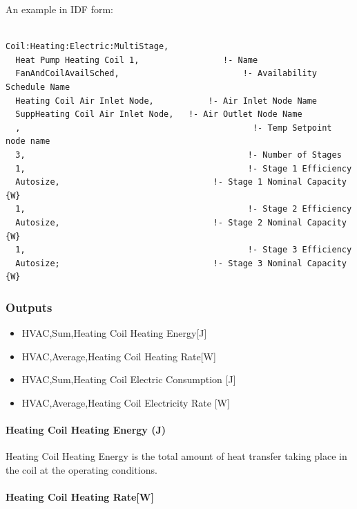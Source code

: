 An example in IDF form:

\begin{lstlisting}

Coil:Heating:Electric:MultiStage,
  Heat Pump Heating Coil 1,                 !- Name
  FanAndCoilAvailSched,                         !- Availability Schedule Name
  Heating Coil Air Inlet Node,           !- Air Inlet Node Name
  SuppHeating Coil Air Inlet Node,   !- Air Outlet Node Name
  ,                                               !- Temp Setpoint node name
  3,                                             !- Number of Stages
  1,                                             !- Stage 1 Efficiency
  Autosize,                               !- Stage 1 Nominal Capacity {W}
  1,                                             !- Stage 2 Efficiency
  Autosize,                               !- Stage 2 Nominal Capacity {W}
  1,                                             !- Stage 3 Efficiency
  Autosize;                               !- Stage 3 Nominal Capacity {W}
\end{lstlisting}

\subsubsection{Outputs}\label{outputs-3-009}

\begin{itemize}
\item
  HVAC,Sum,Heating Coil Heating Energy{[}J{]}
\item
  HVAC,Average,Heating Coil Heating Rate{[}W{]}
\item
  HVAC,Sum,Heating Coil Electric Consumption {[}J{]}
\item
  HVAC,Average,Heating Coil Electricity Rate {[}W{]}
\end{itemize}

\paragraph{Heating Coil Heating Energy (J)}\label{heating-coil-energy-j}

Heating Coil Heating Energy is the total amount of heat transfer taking place in the coil at the operating conditions.

\paragraph{Heating Coil Heating Rate{[}W{]}}\label{heating-coil-ratew}

